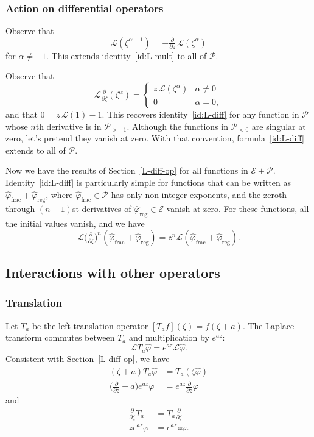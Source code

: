\documentclass{article}
\theoremstyle{definition}
\theoremstyle{plain}
\newcommand{\laplace}{\mathcal{L}}
\begin{document}
\subsubsection{Action on differential operators}\label{L-diff-op-alg}
Observe that
\[ \laplace(\zeta^{\alpha + 1}) = -\tfrac{\partial}{\partial z}\,\laplace(\zeta^\alpha) \]
for $\alpha \neq -1$. This extends identity~\ref{id:L-mult} to all of $\mathcal{P}$.

Observe that
\[ \laplace\tfrac{\partial}{\partial \zeta}(\zeta^\alpha) = \begin{cases}
z\,\laplace(\zeta^\alpha) & \alpha \neq 0 \\
0 & \alpha = 0,
\end{cases} \]
and that $0 = z\,\laplace(1) - 1$. This recovers identity~\ref{id:L-diff} for any function in $\mathcal{P}$ whose $n$th derivative is in $\mathcal{P}_{> -1}$. Although the functions in $\mathcal{P}_{< 0}$ are singular at zero, let's pretend they vanish at zero. With that convention, formula~\ref{id:L-diff} extends to all of $\mathcal{P}$.

Now we have the results of Section~\ref{L-diff-op} for all functions in $\mathcal{E} + \mathcal{P}$. Identity~\ref{id:L-diff} is particularly simple for functions that can be written as $\hat{\varphi}_\text{frac} + \hat{\varphi}_\text{reg}$, where $\hat{\varphi}_\text{frac} \in \mathcal{P}$ has only non-integer exponents, and the zeroth through $(n-1)$st derivatives of $\hat{\varphi}_\text{reg} \in \mathcal{E}$ vanish at zero. For these functions, all the initial values vanish, and we have
\[ \laplace \big(\tfrac{\partial}{\partial \zeta}\big)^n (\hat{\varphi}_\text{frac} + \hat{\varphi}_\text{reg}) = z^n \laplace (\hat{\varphi}_\text{frac} + \hat{\varphi}_\text{reg}). \]
\subsection{Interactions with other operators}
\subsubsection{Translation}
Let $T_a$ be the left translation operator $[T_a f](\zeta) = f(\zeta + a)$. The Laplace transform commutes between $T_a$ and multiplication by $e^{az}$:
\[ \laplace T_a \hat{\varphi} = e^{az} \laplace \hat{\varphi}. \]
Consistent with Section~\ref{L-diff-op}, we have
\begin{align*}
(\zeta + a) T_a \hat{\varphi} & = T_a(\zeta \hat{\varphi}) \\
\big(\tfrac{\partial}{\partial z} - a\big) e^{az} \varphi & = e^{az} \tfrac{\partial}{\partial z} \varphi
\end{align*}
and
\begin{align*}
\tfrac{\partial}{\partial \zeta} T_a & = T_a \tfrac{\partial}{\partial \zeta} \\
z e^{az} \varphi & = e^{az} z \varphi.
\end{align*}
\end{document}
